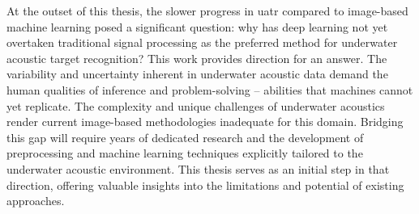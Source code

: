 At the outset of this thesis, the slower progress in \acrshort{uatr} compared to image-based machine learning posed a significant question: why has deep learning not yet overtaken traditional signal processing as the preferred method for underwater acoustic target recognition? This work provides direction for an answer. The variability and uncertainty inherent in underwater acoustic data demand the  human qualities of inference and problem-solving -- abilities that machines cannot yet replicate. The complexity and unique challenges of underwater acoustics render current image-based methodologies inadequate for this domain. Bridging this gap will require years of dedicated research and the development of preprocessing and machine learning techniques explicitly tailored to the underwater acoustic environment. This thesis serves as an initial step in that direction, offering valuable insights into the limitations and potential of existing approaches.

